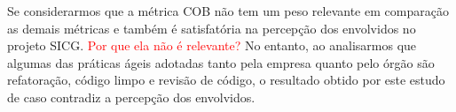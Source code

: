 Se considerarmos que a métrica COB não tem um peso relevante em comparação as demais métricas e também é satisfatória na percepção dos envolvidos no projeto SICG. \textcolor{red}{Por que ela não é relevante?} No entanto, ao analisarmos que algumas das práticas ágeis adotadas tanto pela empresa quanto pelo órgão são refatoração, código limpo e revisão de código, o resultado obtido por este estudo de caso contradiz a percepção dos envolvidos.

\textcolor{red}{}

\textcolor{red}{}



